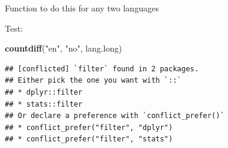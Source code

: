 \documentclass[ignorenonframetext,]{beamer}
\newenvironment{Shaded}{\begin{snugshade}}{\end{snugshade}}
\newcommand{\ControlFlowTok}[1]{\textcolor[rgb]{0.13,0.29,0.53}{\textbf{#1}}}
\newcommand{\DataTypeTok}[1]{\textcolor[rgb]{0.13,0.29,0.53}{#1}}
\newcommand{\FloatTok}[1]{\textcolor[rgb]{0.00,0.00,0.81}{#1}}
\newcommand{\KeywordTok}[1]{\textcolor[rgb]{0.13,0.29,0.53}{\textbf{#1}}}
\newcommand{\NormalTok}[1]{#1}
\newcommand{\OperatorTok}[1]{\textcolor[rgb]{0.81,0.36,0.00}{\textbf{#1}}}
\newcommand{\StringTok}[1]{\textcolor[rgb]{0.31,0.60,0.02}{#1}}
\begin{document}
\begin{frame}[fragile]{Function to do this for any two languages}
\protect\hypertarget{function-to-do-this-for-any-two-languages}{}

\begin{Shaded}
\end{Shaded}

Test:

\begin{Shaded}
\begin{Highlighting}[]
\KeywordTok{countdiff}\NormalTok{(}\StringTok{"en"}\NormalTok{, }\StringTok{"no"}\NormalTok{, lang.long)}
\end{Highlighting}
\end{Shaded}

\begin{verbatim}
## [conflicted] `filter` found in 2 packages.
## Either pick the one you want with `::` 
## * dplyr::filter
## * stats::filter
## Or declare a preference with `conflict_prefer()`
## * conflict_prefer("filter", "dplyr")
## * conflict_prefer("filter", "stats")
\end{verbatim}

\end{frame}
\end{document}

